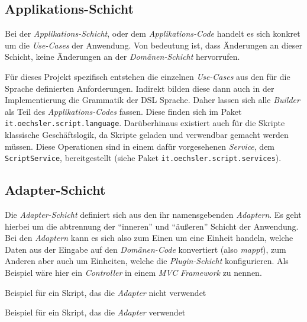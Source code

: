 \subsection{Applikations-Schicht}
\label{subsec:appliktions_schicht}

Bei der \emph{Applikations-Schicht}, oder dem \emph{Applikations-Code} handelt es sich konkret um die \emph{Use-Cases} der Anwendung.
Von bedeutung ist, dass Änderungen an dieser Schicht, keine Änderungen an der \emph{Domänen-Schicht} hervorrufen.

Für dieses Projekt spezifisch entstehen die einzelnen \emph{Use-Cases} aus den für die Sprache definierten Anforderungen. 
Indirekt bilden diese dann auch in der Implementierung die Grammatik der DSL Sprache.
Daher lassen sich alle \emph{Builder} als Teil des \emph{Applikations-Codes} fassen.
Diese finden sich im Paket \texttt{it.oechsler.script.language}.
Darüberhinaus existiert auch für die Skripte klassische Geschäftslogik, da Skripte geladen und verwendbar gemacht werden müssen.
Diese Operationen sind in einem dafür vorgesehenen \emph{Service}, dem \texttt{ScriptService}, bereitgestellt (siehe Paket \texttt{it.oechsler.script.services}).

\subsection{Adapter-Schicht}
\label{subsec:adapter_schicht}

Die \emph{Adapter-Schicht} definiert sich aus den ihr namensgebenden \emph{Adaptern}.
Es geht hierbei um die abtrennung der \enquote{inneren} und \enquote{äußeren} Schicht der Anwendung.
Bei den \emph{Adaptern} kann es sich also zum Einen um eine Einheit handeln, welche Daten aus der Eingabe auf den \emph{Domänen-Code} konvertiert (also \emph{mappt}), zum Anderen aber auch um Einheiten, welche die \emph{Plugin-Schicht} konfigurieren. 
Als Beispiel wäre hier ein \emph{Controller} in einem \emph{MVC} \emph{Framework} zu nennen.

\vspace{5mm}
\begin{listing}[h]

    \caption{Beispiel für ein Skript, das die \emph{Adapter} nicht verwendet}
    \label{lst:noadapter}
\end{listing}
\vspace{5mm}

\begin{listing}[h]
        
    \caption{Beispiel für ein Skript, das die \emph{Adapter} verwendet}
    \label{lst:adapter}
\end{listing}
\vspace{5mm}


